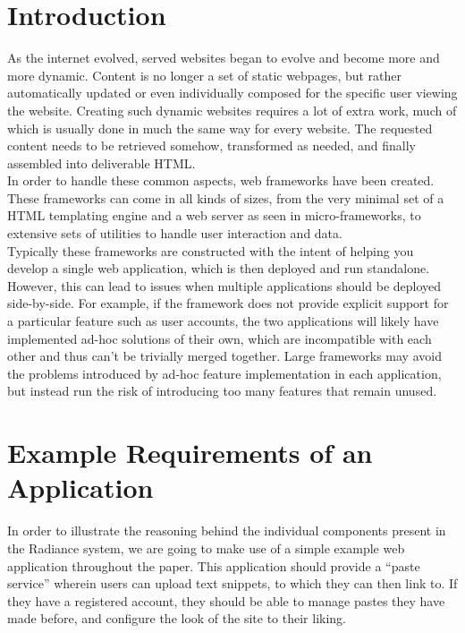 \documentclass{sig-alternate}
\begin{document}
\newpage

\section{Introduction}
As the internet evolved, served websites began to evolve and become more and more dynamic. Content is no longer a set of static webpages, but rather automatically updated or even individually composed for the specific user viewing the website. Creating such dynamic websites requires a lot of extra work, much of which is usually done in much the same way for every website. The requested content needs to be retrieved somehow, transformed as needed, and finally assembled into deliverable HTML. \\

In order to handle these common aspects, web frameworks have been created. These frameworks can come in all kinds of sizes, from the very minimal set of a HTML templating engine and a web server as seen in micro-frameworks\cite{microframeworks}, to extensive sets of utilities to handle user interaction and data. \\

Typically these frameworks are constructed with the intent of helping you develop a single web application, which is then deployed and run standalone. However, this can lead to issues when multiple applications should be deployed side-by-side. For example, if the framework does not provide explicit support for a particular feature such as user accounts, the two applications will likely have implemented ad-hoc solutions of their own, which are incompatible with each other and thus can't be trivially merged together. Large frameworks may avoid the problems introduced by ad-hoc feature implementation in each application, but instead run the risk of introducing too many features that remain unused. \\

\section{Example Requirements of an Application}
In order to illustrate the reasoning behind the individual components present in the Radiance system, we are going to make use of a simple example web application throughout the paper. This application should provide a ``paste service'' wherein users can upload text snippets, to which they can then link to. If they have a registered account, they should be able to manage pastes they have made before, and configure the look of the site to their liking. \\
\end{document}
